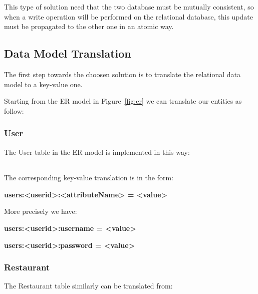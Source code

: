 This type of solution need that the two database must be mutually consistent, so
when a write operation will be performed on the relational database, this update
must be propagated to the other one in an atomic way.

\subsection{Data Model Translation}

The first step towards the choosen solution is to translate the relational data
model to a key-value one.

Starting from the ER model in Figure~\ref{fig:er} we can translate our entities
as follow:

\subsubsection{User}

The User table in the ER model is implemented in this way:

\begin{tabular}{|l|l|l|}
	\hline
	\thead{UserID} & \thead{Username} & \thead{Password} \\
	\hline
\end{tabular}

The corresponding key-value translation is in the form:

\centerline{\textbf{users:<userid>:<attributeName> = <value>}}

More precisely we have:

\centerline{\textbf{users:<userid>:username = <value>}}

\centerline{\textbf{users:<userid>:password = <value>}}

\subsubsection{Restaurant}

The Restaurant table similarly can be translated from:


